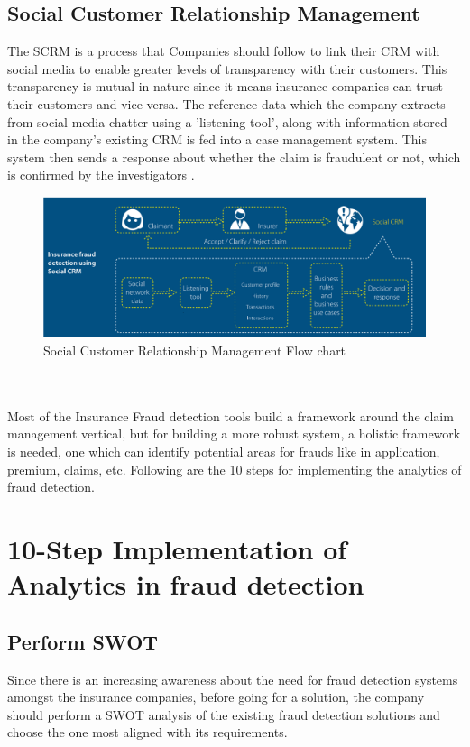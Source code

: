 \documentclass[sigconf]{acmart}
\begin{document}
\subsection{Social Customer Relationship Management}
The SCRM is a process that Companies should follow to link their CRM with social media to enable greater levels of transparency with their customers. This transparency is mutual in nature since it means insurance companies can trust their customers and vice-versa. The reference data which the company extracts from social media chatter using a 'listening tool', along with information stored in the company's existing CRM is fed into a case management system. This system then sends a response about whether the claim is fraudulent or not, which is confirmed by the investigators \cite{link7}.
\begin{figure}
  \includegraphics[width=\linewidth]{images/SCRM_image1.png}
  \caption{Social Customer Relationship Management Flow chart}
  \label{Figure 3:Social Customer Relationship Management Flow chart}
\end{figure}
\\
\\
Most of the Insurance Fraud detection tools build a framework around the claim management vertical, but for building a more robust system, a holistic framework is needed, one which can identify potential areas for frauds like in application, premium, claims, etc. Following are the 10 steps for implementing the analytics of fraud detection.

\section{10-Step Implementation of Analytics in fraud detection}
\subsection{Perform SWOT}
Since there is an increasing awareness about the need for fraud detection systems amongst the insurance companies, before going for a solution, the company should perform a SWOT analysis of the existing fraud detection solutions and choose the one most aligned with its requirements.
\end{document}
